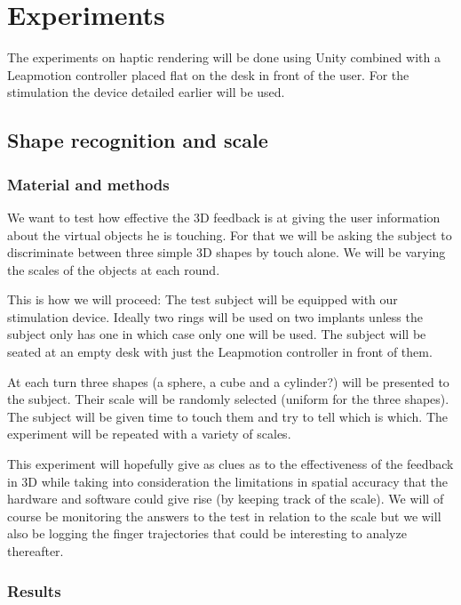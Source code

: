 \documentclass[10pt,journal,compsoc]{IEEEtran}
\begin{document}
\section{Experiments}
The experiments on haptic rendering will be done using Unity combined with a Leapmotion controller placed flat on the desk in front of the user. For the stimulation the device detailed earlier will be used.

\subsection{Shape recognition and scale}
\subsubsection{Material and methods}
\label{Shape recognition and scale}

We want to test how effective the 3D feedback is at giving the user information about the virtual objects he is touching. For that we will be asking the subject to discriminate between three simple 3D shapes by touch alone. We will be varying the scales of the objects at each round.

This is how we will proceed:
The test subject will be equipped with our stimulation device. Ideally two rings will be used on two implants unless the subject only has one in which case only one will be used. The subject will be seated at an empty desk with just the Leapmotion controller in front of them. 

At each turn three shapes (a sphere, a cube and a cylinder?) will be presented to the subject. Their scale will be randomly selected (uniform for the three shapes). The subject will be given time to touch them and try to tell which is which. The experiment will be repeated with a variety of scales.

This experiment will hopefully give as clues as to the effectiveness of the feedback in 3D while taking into consideration the limitations in spatial accuracy that the hardware and software could give rise (by keeping track of the scale).
We will of course be monitoring the answers to the test in relation to the scale but we will also be logging the finger trajectories that could be interesting to analyze thereafter.

\subsubsection{Results}
		
\end{document}
